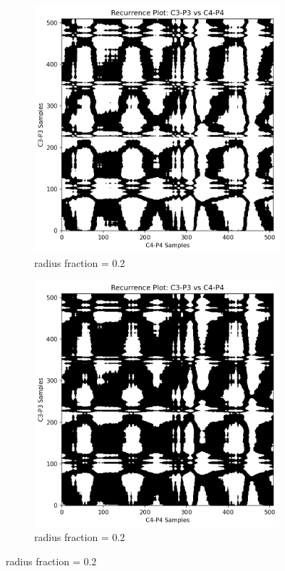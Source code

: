 \documentclass{article}
\begin{document}
\begin{figure}[htbp]
	    \vspace{0.5cm} %

	    \begin{subfigure}[t]{0.45\textwidth}
		\centering
		\includegraphics[width=\textwidth]{rr_compare/r02_epil.png}
		\caption{radius fraction = 0.2}
		\label{subfig:rp3}
	    \end{subfigure}
	    \hfill
	    \begin{subfigure}[t]{0.45\textwidth}
		\centering
		\includegraphics[width=\textwidth]{rr_compare/r03_epil.png}
		\caption{radius fraction = 0.2}
		\label{subfig:rp4}
	    \end{subfigure}


\end{figure}
\end{document}
